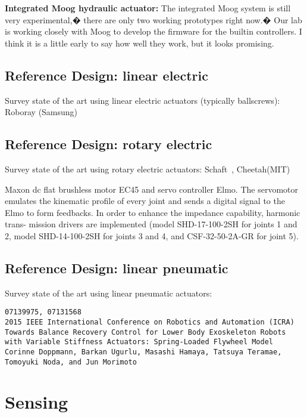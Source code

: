 \documentclass[letterpaper,12pt,fullpage]{article}
\begin{document}
{\bf Integrated Moog hydraulic actuator:}
The integrated Moog system is still very experimental,� there are
only two working prototypes right now.� Our lab is working closely
with Moog to develop the firmware for the builtin controllers. I
think it is a little early to say how well they work, but it looks
promising.


\subsection{Reference Design: linear electric}

Survey state of the art using linear electric actuators (typically ballscrews):
Roboray (Samsung)

\subsection{Reference Design: rotary electric}

Survey state of the art using rotary electric actuators:
Schaft~\cite{shaft_foot_placement,shaft_push_recov}, Cheetah(MIT)

Maxon dc flat brushless motor EC45 and servo controller
Elmo. The servomotor emulates the kinematic profile of every
joint and sends a digital signal to the Elmo to form feedbacks.
In order to enhance the impedance capability, harmonic trans-
mission drivers are implemented (model SHD-17-100-2SH
for joints 1 and 2, model SHD-14-100-2SH for joints 3 and 4,
and CSF-32-50-2A-GR for joint 5).~\cite{IEEE07128705}

\subsection{Reference Design: linear pneumatic}

Survey state of the art using linear pneumatic actuators:

\begin{verbatim}
07139975, 07131568
2015 IEEE International Conference on Robotics and Automation (ICRA)
Towards Balance Recovery Control for Lower Body Exoskeleton Robots
with Variable Stiffness Actuators: Spring-Loaded Flywheel Model
Corinne Doppmann, Barkan Ugurlu, Masashi Hamaya, Tatsuya Teramae,
Tomoyuki Noda, and Jun Morimoto
\end{verbatim}

\section{Sensing}
\end{document}
